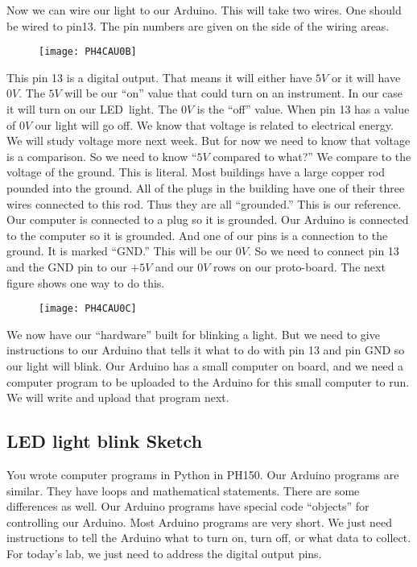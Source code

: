 Now we can wire our light to our Arduino. This will take two wires. One should be wired to pin13. The pin numbers are given on the side of the wiring areas. 

\begin{figure}[h!]
	\centering
	\texttt{[image: PH4CAU0B]}
\end{figure}

This pin 13 is a digital output. That means it will either have $5\unit{V}$ or it will have $0\unit{V}.$ The $5\unit{V}$ will be our ``on'' value that could turn on an instrument. In our case it will turn on our LED\ light. The $0\unit{V}$ is the ``off'' value. When pin 13 has a value of $0\unit{V}$ our light will go off. We know that voltage is related to electrical energy. We will study voltage more next week. But for now we need to know that voltage is a comparison. So we need to know
``$5\unit{V}$ compared to what?'' We compare to the voltage of the ground. This is literal. Most buildings have a large copper rod pounded into the ground. All of the plugs in the building have one of their three wires connected to this rod. Thus they are all ``grounded.'' This is our reference. Our computer is connected to a plug so it is grounded. Our Arduino is connected to the computer so it is grounded. And one of our pins is a connection to the ground. It is marked ``GND.'' This will be our $0\unit{V}.$ So we need to connect pin 13 and the GND pin to our $+5\unit{V}$ and our $0\unit{V}$ rows on our proto-board. The next figure shows one way to do this.

\begin{figure}[h!]
	\centering
	\texttt{[image: PH4CAU0C]}
\end{figure}

We now have our ``hardware'' built for blinking a light. But we need to give instructions to our Arduino that tells it what to do with pin 13 and pin GND so our light will blink. Our Arduino has a small computer on board, and we need a computer program to be uploaded to the Arduino for this small computer to run. We will write and upload that program next.

\subsection{LED light blink Sketch}

You wrote computer programs in Python in PH150. Our Arduino programs are similar. They have loops and mathematical statements. There are some differences as well. Our Arduino programs have special code ``objects'' for controlling our Arduino. Most Arduino programs are very short. We just need instructions to tell the Arduino what to turn on, turn off, or what data to collect. For today's lab, we just need to address the digital output pins.


